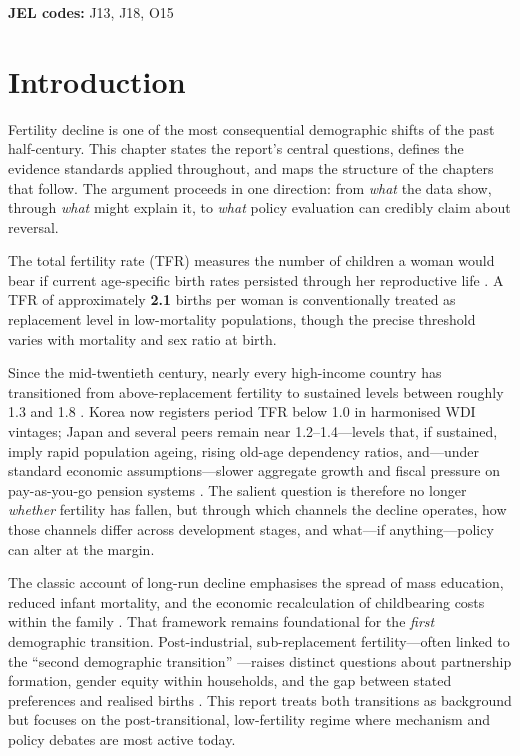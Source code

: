 \documentclass[11pt,a4paper,openany]{book}
\begin{document}
\noindent\textbf{JEL codes:} J13, J18, O15

\tableofcontents
\listoffigures
\listoftables

\mainmatter
\FloatBarrier

\chapter{Introduction}

Fertility decline is one of the most consequential demographic shifts of the past half-century. This chapter states the report's central questions, defines the evidence standards applied throughout, and maps the structure of the chapters that follow. The argument proceeds in one direction: from \emph{what} the data show, through \emph{what} might explain it, to \emph{what} policy evaluation can credibly claim about reversal.

The total fertility rate (TFR) measures the number of children a woman would bear if current age-specific birth rates persisted through her reproductive life \citep{un2022}. A TFR of approximately \textbf{2.1} births per woman is conventionally treated as replacement level in low-mortality populations, though the precise threshold varies with mortality and sex ratio at birth.

Since the mid-twentieth century, nearly every high-income country has transitioned from above-replacement fertility to sustained levels between roughly 1.3 and 1.8 \citep{frejka2017,kohler2002}. Korea now registers period TFR below 1.0 in harmonised WDI vintages; Japan and several peers remain near 1.2--1.4---levels that, if sustained, imply rapid population ageing, rising old-age dependency ratios, and---under standard economic assumptions---slower aggregate growth and fiscal pressure on pay-as-you-go pension systems \citep{morgan2003,bloom2010,mcdonald2006}. The salient question is therefore no longer \emph{whether} fertility has fallen, but through which channels the decline operates, how those channels differ across development stages, and what---if anything---policy can alter at the margin.

The classic account of long-run decline emphasises the spread of mass education, reduced infant mortality, and the economic recalculation of childbearing costs within the family \citep{caldwell1982}. That framework remains foundational for the \emph{first} demographic transition. Post-industrial, sub-replacement fertility---often linked to the ``second demographic transition'' \citep{lesthaeghe2010}---raises distinct questions about partnership formation, gender equity within households, and the gap between stated preferences and realised births \citep{goldscheider2015,sobotka2017}. This report treats both transitions as background but focuses on the post-transitional, low-fertility regime where mechanism and policy debates are most active today.
\end{document}
